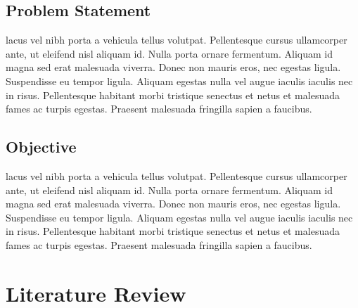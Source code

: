\documentclass{fisatproject}
\begin{document}
\section{Problem Statement}

lacus vel nibh porta a vehicula tellus volutpat. Pellentesque cursus ullamcorper ante, ut eleifend nisl aliquam id. Nulla porta ornare fermentum. Aliquam id magna sed erat malesuada viverra. Donec non mauris eros, nec egestas ligula. Suspendisse eu tempor ligula. Aliquam egestas nulla vel augue iaculis iaculis nec in risus. Pellentesque habitant morbi tristique senectus et netus et malesuada fames ac turpis egestas. Praesent malesuada fringilla sapien a faucibus.

\section{Objective}

lacus vel nibh porta a vehicula tellus volutpat. Pellentesque cursus ullamcorper ante, ut eleifend nisl aliquam id. Nulla porta ornare fermentum. Aliquam id magna sed erat malesuada viverra. Donec non mauris eros, nec egestas ligula. Suspendisse eu tempor ligula. Aliquam egestas nulla vel augue iaculis iaculis nec in risus. Pellentesque habitant morbi tristique senectus et netus et malesuada fames ac turpis egestas. Praesent malesuada fringilla sapien a faucibus.

\chapter{Literature Review}
\end{document}
